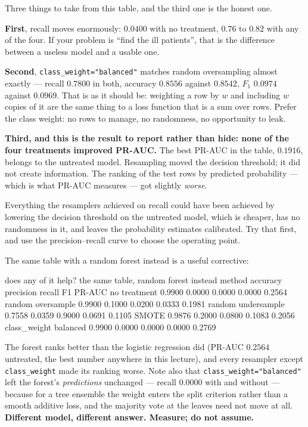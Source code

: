 \documentclass[11pt]{article}
\begin{document}
Three things to take from this table, and the third one is the honest one.

\textbf{First}, recall moves enormously: $0.0400$ with no treatment, $0.76$ to
$0.82$ with any of the four. If your problem is ``find the ill patients'',
that is the difference between a useless model and a usable one.

\textbf{Second}, \texttt{class\_weight="balanced"} matches random oversampling
almost exactly --- recall $0.7800$ in both, accuracy $0.8556$ against
$0.8542$, $F_1$ $0.0974$ against $0.0969$. That is as it should be: weighting
a row by $w$ and including $w$ copies of it are the same thing to a loss
function that is a sum over rows. Prefer the class weight: no rows to manage,
no randomness, no opportunity to leak.

\textbf{Third, and this is the result to report rather than hide: none of the
four treatments improved PR-AUC.} The best PR-AUC in the table, $0.1916$,
belongs to the untreated model. Resampling moved the decision threshold; it
did not create information. The ranking of the test rows by predicted
probability --- which is what PR-AUC measures --- got slightly \emph{worse}.

\begin{caution}
Everything the resamplers achieved on recall could have been achieved by
lowering the decision threshold on the untreated model, which is cheaper, has
no randomness in it, and leaves the probability estimates calibrated. Try that
first, and use the precision--recall curve to choose the operating point.
\end{caution}

The same table with a random forest instead is a useful corrective:

\begin{codeout}
does any of it help? the same table, random forest instead
   method                 accuracy precision  recall      F1   PR-AUC
   no treatment            0.9900    0.0000  0.0000  0.0000   0.2564
   random oversample       0.9900    0.1000  0.0200  0.0333   0.1981
   random undersample      0.7558    0.0359  0.9000  0.0691   0.1105
   SMOTE                   0.9876    0.2000  0.0800  0.1083   0.2056
   class_weight balanced   0.9900    0.0000  0.0000  0.0000   0.2769
\end{codeout}

The forest ranks better than the logistic regression did (PR-AUC $0.2564$
untreated, the best number anywhere in this lecture), and every resampler
except \texttt{class\_weight} made its ranking worse. Note also that
\texttt{class\_weight="balanced"} left the forest's \emph{predictions}
unchanged --- recall $0.0000$ with and without --- because for a tree ensemble
the weight enters the split criterion rather than a smooth additive loss, and
the majority vote at the leaves need not move at all. \textbf{Different model,
different answer. Measure; do not assume.}
\end{document}
